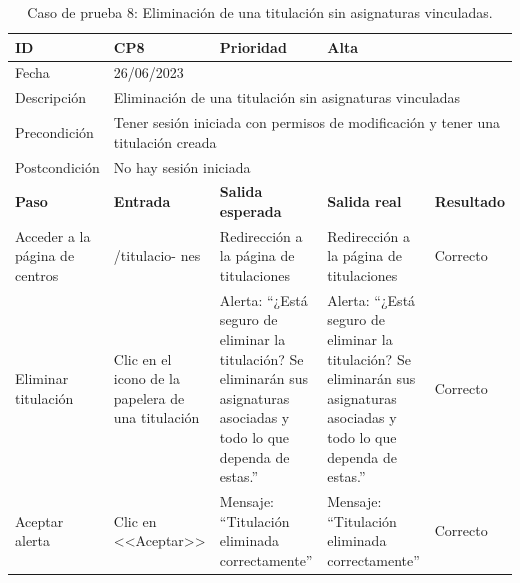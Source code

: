 \begin{table}[H]
\begin{tabular}{p{} p{} p{} p{} p{}}
\cellcolor{gray!25}
ID   & CP8 & \cellcolor{gray!25} Prioridad   & Alta \\ \hline
\cellcolor{gray!25} Fecha	&	\multicolumn{4}{l}{26/06/2023} \\ \hline
\cellcolor{gray!25} Descripción		&	\multicolumn{4}{p{.66\textwidth}}{Eliminación de una titulación sin asignaturas vinculadas} \\ \hline                                            
\cellcolor{gray!25}
Precondición  & \multicolumn{4}{p{.66\textwidth}}{Tener sesión iniciada con permisos de modificación y tener una titulación creada} \\ \hline
\cellcolor{gray!25} Postcondición & \multicolumn{4}{l}{No hay sesión iniciada}                                                    \\ \hline
\rowcolor{gray!25}
\textbf{Paso}   & \textbf{Entrada} & \textbf{Salida esperada} & \textbf{Salida real} & \textbf{Resultado} \\ \hline
Acceder a la página de centros 
& /titulacio-
nes                                                                           
& Redirección a la página de titulaciones                                   
& Redirección a la página de titulaciones                                   
& Correcto                            
\\ \hline
Eliminar titulación
& Clic en el icono de la papelera de una titulación
& Alerta: ``¿Está seguro de eliminar la titulación? Se eliminarán sus asignaturas asociadas y todo lo que dependa de estas.''
& Alerta: ``¿Está seguro de eliminar la titulación? Se eliminarán sus asignaturas asociadas y todo lo que dependa de estas.''
& Correcto
\\ \hline
Aceptar alerta
& Clic en <<Aceptar>>
& Mensaje: ``Titulación eliminada correctamente''                            
& Mensaje: ``Titulación eliminada correctamente''
& Correcto                            
\\ \hline                
\end{tabular}
\caption{Caso de prueba 8: Eliminación de una titulación sin asignaturas vinculadas.}
\end{table}

